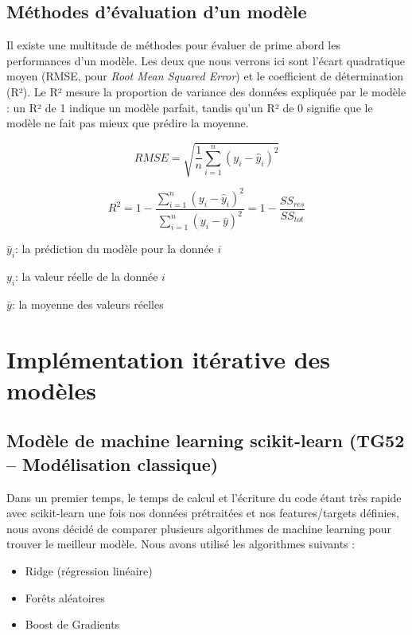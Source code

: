 \documentclass[11pt,a4paper]{article}
\begin{document}
\subsection{Méthodes d'évaluation d'un modèle}

Il existe une multitude de méthodes pour évaluer de prime abord les performances d'un modèle. Les deux que nous verrons ici sont l'écart quadratique moyen (RMSE, pour \textit{Root Mean Squared Error}) et le coefficient de détermination (R²). Le R² mesure la proportion de variance des données expliquée par le modèle : un R² de 1 indique un modèle parfait, tandis qu'un R² de 0 signifie que le modèle ne fait pas mieux que prédire la moyenne.

\begin{equation}
RMSE = \sqrt{\frac{1}{n}\sum_{i=1}^{n}(y_i - \hat{y}_i)^2}
\end{equation}

\begin{equation}
R^2 = 1 - \frac{\sum_{i=1}^{n}(y_i - \hat{y}_i)^2}{\sum_{i=1}^{n}(y_i - \bar{y})^2} = 1 - \frac{SS_{res}}{SS_{tot}}
\end{equation}

$\hat{y}_i$: la prédiction du modèle pour la donnée $i$

$y_i$: la valeur réelle de la donnée $i$

$\bar{y}$: la moyenne des valeurs réelles


\clearpage
\section{Implémentation itérative des modèles}

\subsection{Modèle de machine learning scikit-learn (TG52 -- Modélisation classique)}

Dans un premier temps, le temps de calcul et l'écriture du code étant très rapide avec scikit-learn une fois nos données prétraitées et nos features/targets définies, nous avons décidé de comparer plusieurs algorithmes de machine learning pour trouver le meilleur modèle. Nous avons utilisé les algorithmes suivants :

\begin{itemize}
    \item Ridge (régression linéaire)
    \item Forêts aléatoires
    \item Boost de Gradients
\end{itemize}
\end{document}
